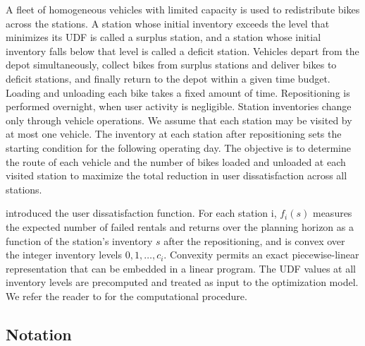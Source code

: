 A fleet of homogeneous vehicles with limited capacity is used to redistribute bikes across the stations. A station whose initial inventory exceeds the level that minimizes its UDF is called a surplus station, and a station whose initial inventory falls below that level is called a deficit station. Vehicles depart from the depot simultaneously, collect bikes from surplus stations and deliver bikes to deficit stations, and finally return to the depot within a given time budget. Loading and unloading each bike takes a fixed amount of time. Repositioning is performed overnight, when user activity is negligible. Station inventories change only through vehicle operations. We assume that each station may be visited by at most one vehicle. The inventory at each station after repositioning sets the starting condition for the following operating day. The objective is to determine the route of each vehicle and the number of bikes loaded and unloaded at each visited station to maximize the total reduction in user dissatisfaction across all stations.

\citet{ravivOptimalInventoryManagement2013} introduced the user dissatisfaction function. For each station i, ${{f}_{i}}\left( s \right)$ measures the expected number of failed rentals and returns over the planning horizon as a function of the station's inventory $s$ after the repositioning, and is convex over the integer inventory levels $0,1,\ldots ,{{c}_{i}}$. Convexity permits an exact piecewise-linear representation that can be embedded in a linear program. The UDF values at all inventory levels are precomputed and treated as input to the optimization model. We refer the reader to \citet{ravivOptimalInventoryManagement2013} for the computational procedure.

\subsection{Notation}\label{ch3:subsec:mvbrp-notation}

